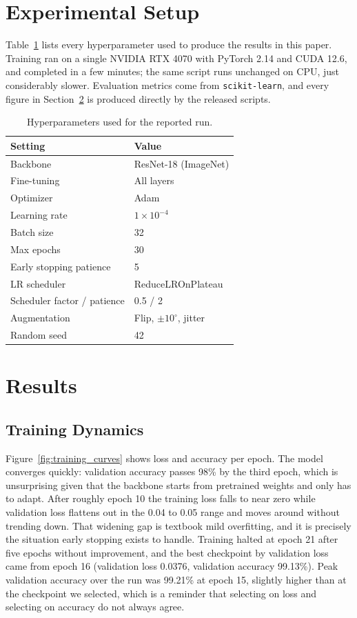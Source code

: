 \documentclass[twocolumn]{article}
\begin{document}
\section{Experimental Setup}
\label{sec:setup}
Table~\ref{tab:hyper} lists every hyperparameter used to produce the results in this paper. Training ran on a single NVIDIA RTX 4070 with PyTorch 2.14 and CUDA 12.6, and completed in a few minutes; the same script runs unchanged on CPU, just considerably slower. Evaluation metrics come from \texttt{scikit-learn}, and every figure in Section~\ref{sec:results} is produced directly by the released scripts.

\begin{table}[H]
\centering
\caption{Hyperparameters used for the reported run.}
\label{tab:hyper}
\begin{tabular}{ll}
\toprule
Setting & Value \\
\midrule
Backbone & ResNet-18 (ImageNet) \\
Fine-tuning & All layers \\
Optimizer & Adam \\
Learning rate & $1 \times 10^{-4}$ \\
Batch size & 32 \\
Max epochs & 30 \\
Early stopping patience & 5 \\
LR scheduler & ReduceLROnPlateau \\
Scheduler factor / patience & 0.5 / 2 \\
Augmentation & Flip, $\pm10^\circ$, jitter \\
Random seed & 42 \\
\bottomrule
\end{tabular}
\end{table}

\section{Results}
\label{sec:results}

\subsection{Training Dynamics}
Figure~\ref{fig:training_curves} shows loss and accuracy per epoch. The model converges quickly: validation accuracy passes 98\% by the third epoch, which is unsurprising given that the backbone starts from pretrained weights and only has to adapt. After roughly epoch 10 the training loss falls to near zero while validation loss flattens out in the 0.04 to 0.05 range and moves around without trending down. That widening gap is textbook mild overfitting, and it is precisely the situation early stopping exists to handle. Training halted at epoch 21 after five epochs without improvement, and the best checkpoint by validation loss came from epoch 16 (validation loss 0.0376, validation accuracy 99.13\%). Peak validation accuracy over the run was 99.21\% at epoch 15, slightly higher than at the checkpoint we selected, which is a reminder that selecting on loss and selecting on accuracy do not always agree.
\end{document}

